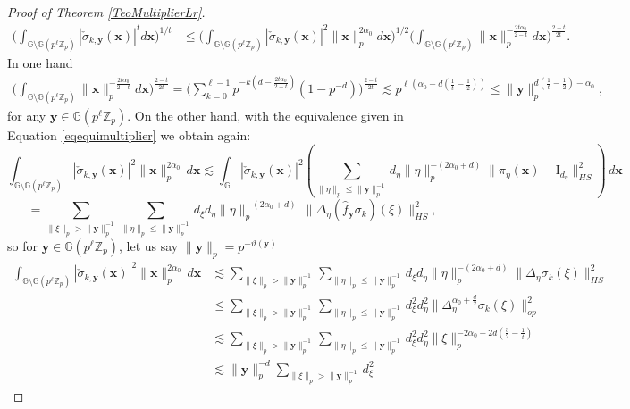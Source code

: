 \documentclass[12pt, reqno]{amsart}
\newcommand{\Z}{\mathbb{Z}}
\newcommand{\1}{\mathds{1}}
\newcommand{\G}{\mathbb{G}}
\begin{document}
\begin{proof}[Proof of Theorem \ref{TeoMultiplierLr}]
\begin{align*}
    \Big( \int_{\G \setminus \G (p^\ell \Z_p)}|\check{\sigma}_{k,\mathbf{y}}(\mathbf{x})|^t d \mathbf{x} \Big)^{1/t} & \leq \Big(\int_{\G \setminus \G (p^\ell \Z_p)}|\check{\sigma}_{k,\mathbf{y}}(\mathbf{x})|^2 \| \mathbf{x}\|_p^{2 \alpha_0} d \mathbf{x} \Big)^{1/2} \Big( \int_{\G \setminus \G (p^\ell \Z_p)}\| \mathbf{x} \|_p^{-\frac{2t \alpha_0}{2-t}} d \mathbf{x} \Big)^{\frac{2-t}{2t}}.
\end{align*}In one hand 
\begin{align*}
    \Big( \int_{\G \setminus \G (p^\ell \Z_p)}\| \mathbf{x} \|_p^{-\frac{2t \alpha_0}{2-t}} d \mathbf{x} \Big)^{\frac{2-t}{2t}} = \Big( \sum_{k=0}^{ \ell -1} p^{-k(d- \frac{2t \alpha_0}{2-t})}(1-p^{-d}) \Big)^{\frac{2-t}{2t}} \lesssim p^{\ell(\alpha_0 - d(\frac{1}{t}- \frac{1}{2}))} \leq \| \mathbf{y} \|_p^{ d(\frac{1}{t}- \frac{1}{2}) - \alpha_0},
\end{align*}for any $\mathbf{y} \in \G (p^\ell \Z_p)$.  On the other hand, with the equivalence given in Equation \ref{eqequimultiplier} we obtain again: 
\[
\int_{\G \setminus \G(p^\ell \mathbb{Z}_p)}
|\check{\sigma}_{k,\mathbf{y}}(\mathbf{x})|^2
\|\mathbf{x}\|_p^{2 \alpha_0 }
\,d\mathbf{x}
\lesssim
\int_{\G}
|\check{\sigma}_{k,\mathbf{y}}(\mathbf{x})|^2
\left(
\sum_{\|\eta\|_p \le \|\mathbf{y}\|_p^{-1}}
d_\eta 
\|\eta\|_p^{-(2 \alpha_0 +d)}
\|\pi_\eta(\mathbf{x})-\mathrm{I}_{d_\eta} \|_{HS}^2
\right)
\,d\mathbf{x}
\]
\[
=
\sum_{\|\xi\|_p > \|\mathbf{y}\|_p^{-1}}
\sum_{\|\eta\|_p \le \|\mathbf{y}\|_p^{-1}}
d_\xi d_\eta 
\|\eta\|_p^{-(2 \alpha_0 +d)}
\,
\|\Delta_\eta(\widehat{f}_{\mathbf{y}}\sigma_k)(\xi)\|_{HS}^2,
\]
so for $\mathbf{y} \in \G(p^\ell \Z_p )$, let us say $\| \mathbf{y} \|_p= p^{-\vartheta(\mathbf{y})}$
\begin{align*}    
\int_{\G \setminus \G(p^\ell \mathbb{Z}_p)}
|\check{\sigma}_{k,\mathbf{y}}(\mathbf{x})|^2
\|\mathbf{x}\|_p^{2 \alpha_0}
\,d\mathbf{x}
&\lesssim
\sum_{\|\xi\|_p > \|\mathbf{y}\|_p^{-1}}
\sum_{\|\eta\|_p \le \|\mathbf{y}\|_p^{-1}}
d_\xi d_\eta 
\|\eta\|_p^{-(2\alpha_0+d)}
\|\Delta_\eta\sigma_k(\xi)\|_{HS}^2
\\&\leq  \sum_{\|\xi\|_p > \|\mathbf{y}\|_p^{-1}}
\sum_{\|\eta\|_p \le \|\mathbf{y}\|_p^{-1}}
d_\xi^2 d_\eta^2 
\|\Delta_\eta^{\alpha_0 + \frac{d}{2}}\sigma_k(\xi)\|_{op}^2 \\ & \lesssim \sum_{\|\xi\|_p > \|\mathbf{y}\|_p^{-1}}
\sum_{\|\eta\|_p \le \|\mathbf{y}\|_p^{-1}}
d_\xi^2 d_\eta^2 \|\xi\|_p^{-2\alpha_0-2d(
    \frac{3}{2}-\frac{1}{t})} \\ &\lesssim \|\mathbf{y}\|_p^{-d} \sum_{\|\xi\|_p > \|\mathbf{y}\|_p^{-1}} d_\xi^2  

\end{align*}
\end{proof}
\end{document}
